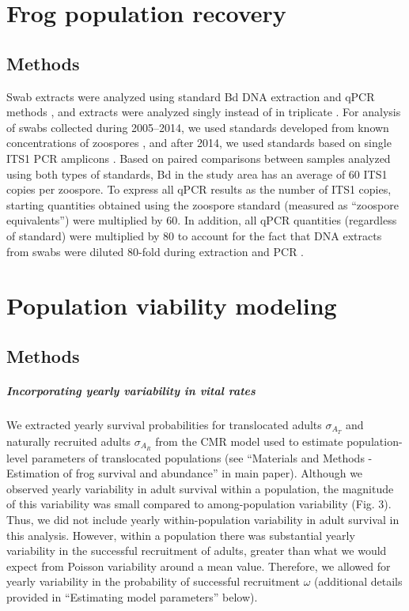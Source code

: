\documentclass[9pt,twoside,lineno]{pnas-new}
\begin{document}
\hypertarget{frog-population-recovery-2}{%
\section{Frog population
recovery}\label{frog-population-recovery-2}}

\hypertarget{methods-1}{%
\subsection{Methods}\label{methods-1}}

Swab extracts were analyzed using standard Bd DNA extraction and qPCR
methods \citep{boyle2004}, and extracts were analyzed singly instead of
in triplicate \citep{kriger2006}. For analysis of swabs collected during
2005--2014, we used standards developed from known concentrations of
zoospores \citep{boyle2004}, and after 2014, we used standards based on
single ITS1 PCR amplicons \citep{longo2013}. Based on paired comparisons
between samples analyzed using both types of standards, Bd in the study
area has an average of 60 ITS1 copies per zoospore. To express all qPCR
results as the number of ITS1 copies, starting quantities obtained using
the zoospore standard (measured as ``zoospore equivalents'') were
multiplied by 60. In addition, all qPCR quantities (regardless of
standard) were multiplied by 80 to account for the fact that DNA
extracts from swabs were diluted 80-fold during extraction and PCR
\citep{vredenburg2010}.

\hypertarget{population-viability-modeling-1}{%
\section{Population viability
modeling}\label{population-viability-modeling-1}}

\hypertarget{methods-2}{%
\subsection{Methods}\label{methods-2}}

\hypertarget{incorporating-yearly-variability-in-vital-rates}{%
\subparagraph{Incorporating yearly variability in vital
rates}\label{incorporating-yearly-variability-in-vital-rates}}

We extracted yearly survival probabilities for translocated adults
\(\sigma_{A_T}\) and naturally recruited adults \(\sigma_{A_R}\) from
the CMR model used to estimate population-level parameters of
translocated populations (see ``Materials and Methods - Estimation of
frog survival and abundance'' in main paper). Although we observed
yearly variability in adult survival within a population, the magnitude
of this variability was small compared to among-population variability
(Fig. 3). Thus, we did not include
yearly within-population variability in adult survival in this analysis.
However, within a population there was substantial yearly variability in
the successful recruitment of adults, greater than what we would expect
from Poisson variability around a mean value. Therefore, we allowed for
yearly variability in the probability of successful recruitment
\(\omega\) (additional details provided in ``Estimating model
parameters'' below).
\end{document}
